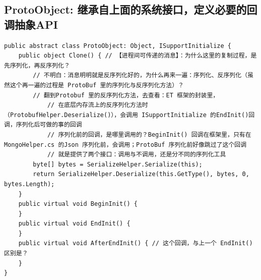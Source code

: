 \documentclass[9pt, b5paper]{article}
\begin{document}
\subsection{ProtoObject: 继承自上面的系统接口，定义必要的回调抽象API}
\label{sec-1-4}
\begin{verbatim}
public abstract class ProtoObject: Object, ISupportInitialize {
    public object Clone() { // 【进程间可传递的消息】：为什么这里的复制过程，是先序列化，再反序列化？
        // 不明白：消息明明就是反序列化好的，为什么再来一遍：序列化、反序列化（虽然这个再一遍的过程是 ProtoBuf 里的序列化与反序列化方法）？
        // 翻到Protobuf 里的反序列化方法，去查看：ET 框架的封装里，
            // 在底层内存流上的反序列化方法时（ProtobufHelper.Deserialize()），会调用 ISupportInitialize 的EndInit()回调，序列化后可做的事的回调
            // 序列化前的回调，是哪里调用的？BeginInit() 回调在框架里，只有在MongoHelper.cs 的Json 序列化前，会调用；ProtoBuf 序列化前好像跳过了这个回调
            // 就是提供了两个接口：调用与不调用，还是分不同的序列化工具
        byte[] bytes = SerializeHelper.Serialize(this);
        return SerializeHelper.Deserialize(this.GetType(), bytes, 0, bytes.Length);
    }
    public virtual void BeginInit() {
    }
    public virtual void EndInit() {
    }
    public virtual void AfterEndInit() { // 这个回调，与上一个 EndInit() 区别是？
    }
}
\end{verbatim}
\end{document}
